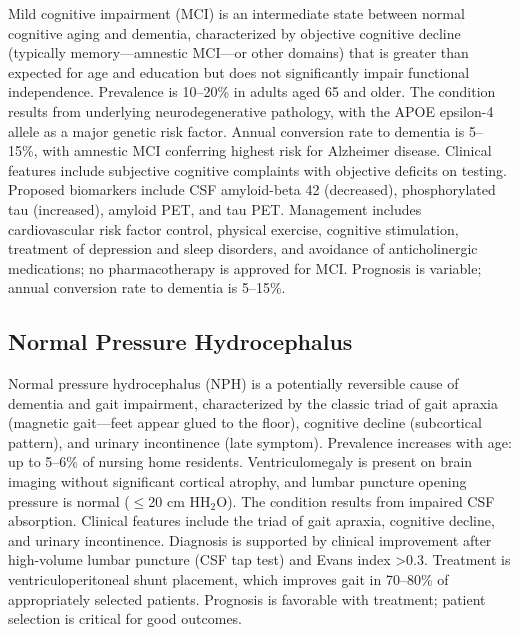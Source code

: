 Mild cognitive impairment (MCI) is an intermediate state between normal cognitive aging and dementia, characterized by objective cognitive decline (typically memory---amnestic MCI---or other domains) that is greater than expected for age and education but does not significantly impair functional independence. Prevalence is 10--20\% in adults aged 65 and older. The condition results from underlying neurodegenerative pathology, with the APOE epsilon-4 allele as a major genetic risk factor. Annual conversion rate to dementia is 5--15\%, with amnestic MCI conferring highest risk for Alzheimer disease. Clinical features include subjective cognitive complaints with objective deficits on testing. Proposed biomarkers include CSF amyloid-beta 42 (decreased), phosphorylated tau (increased), amyloid PET, and tau PET. Management includes cardiovascular risk factor control, physical exercise, cognitive stimulation, treatment of depression and sleep disorders, and avoidance of anticholinergic medications; no pharmacotherapy is approved for MCI. Prognosis is variable; annual conversion rate to dementia is 5--15\%.

\subsection{Normal Pressure Hydrocephalus}
\label{sec:Normal Pressure Hydrocephalus}

Normal pressure hydrocephalus (NPH) is a potentially reversible cause of dementia and gait impairment, characterized by the classic triad of gait apraxia (magnetic gait---feet appear glued to the floor), cognitive decline (subcortical pattern), and urinary incontinence (late symptom). Prevalence increases with age: up to 5--6\% of nursing home residents. Ventriculomegaly is present on brain imaging without significant cortical atrophy, and lumbar puncture opening pressure is normal ($\leq$20 cm HH$_2$O). The condition results from impaired CSF absorption. Clinical features include the triad of gait apraxia, cognitive decline, and urinary incontinence. Diagnosis is supported by clinical improvement after high-volume lumbar puncture (CSF tap test) and Evans index >0.3. Treatment is ventriculoperitoneal shunt placement, which improves gait in 70--80\% of appropriately selected patients. Prognosis is favorable with treatment; patient selection is critical for good outcomes.

